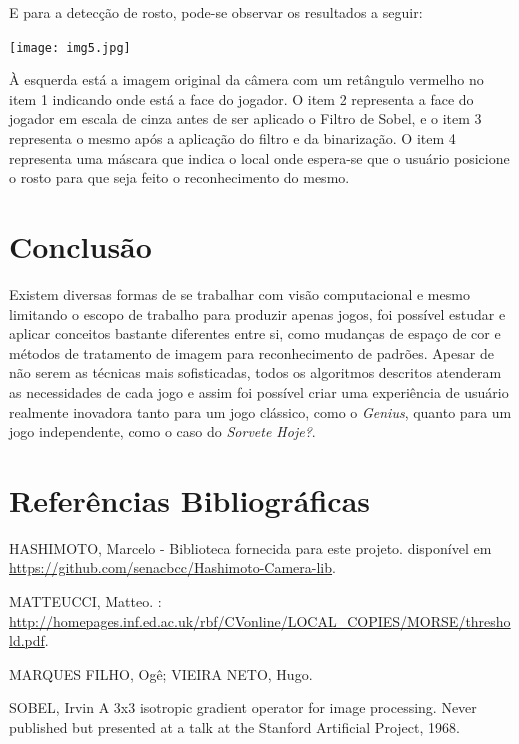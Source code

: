 \documentclass[a4paper]{article}
\begin{document}
E para a detecção de rosto, pode-se observar os resultados a seguir:

\vspace{5.00mm}
\begin{center}
\texttt{[image: img5.jpg]}
\end{center}
\vspace{5.00mm}

À esquerda está a imagem original da câmera com um retângulo vermelho no item 1 indicando onde está a face do jogador.
O item 2 representa a face do jogador em escala de cinza antes de ser aplicado o Filtro de Sobel, e o item 3 representa o mesmo após a aplicação do filtro e da binarização.
O item 4 representa uma máscara que indica o local onde espera-se que o usuário posicione o rosto para que seja feito o reconhecimento do mesmo.

\section{Conclusão}


Existem diversas formas de se trabalhar com visão computacional e mesmo limitando o escopo de trabalho para produzir apenas jogos, foi possível estudar e aplicar conceitos bastante diferentes entre si, como mudanças de espaço de cor e métodos de tratamento de imagem para reconhecimento de padrões. Apesar de não serem as técnicas mais sofisticadas, todos os algoritmos descritos atenderam as necessidades de cada jogo e assim foi possível criar uma experiência de usuário realmente inovadora tanto para um jogo clássico, como o \textit{Genius}, quanto para um jogo independente, como o caso do \textit{Sorvete Hoje?}. 


\section{ Referências Bibliográficas}




\begin{thebibliography}{2}

HASHIMOTO, Marcelo - Biblioteca fornecida para este projeto.
disponível em \url{https://github.com/senacbcc/Hashimoto-Camera-lib}.

MATTEUCCI, Matteo. 
: 
\url{http://homepages.inf.ed.ac.uk/rbf/CVonline/LOCAL_COPIES/MORSE/threshold.pdf}. 

{MARQUES FILHO, Ogê; VIEIRA NETO, Hugo.}

{SOBEL, Irvin}
\newblock A 3x3 isotropic gradient operator for image processing.
\newblock Never published but presented at a talk at the Stanford Artificial
  Project, 1968.

\end{thebibliography}

\break
\end{document}
